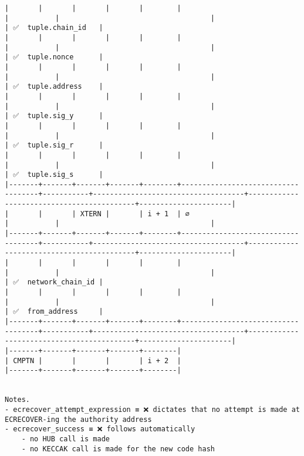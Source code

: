\documentclass[varwidth=\maxdimen,margin=0.5cm,multi={verbatim}]{standalone}
\begin{document}
\begin{verbatim}
|       |       |       |       |        |                                    |           |                                    |                                           | ✅  tuple.chain_id   |
|       |       |       |       |        |                                    |           |                                    |                                           | ✅  tuple.nonce      |
|       |       |       |       |        |                                    |           |                                    |                                           | ✅  tuple.address    |
|       |       |       |       |        |                                    |           |                                    |                                           | ✅  tuple.sig_y      |
|       |       |       |       |        |                                    |           |                                    |                                           | ✅  tuple.sig_r      |
|       |       |       |       |        |                                    |           |                                    |                                           | ✅  tuple.sig_s      |
|-------+-------+-------+-------+--------+------------------------------------+-----------+------------------------------------+-------------------------------------------+----------------------|
|       |       | XTERN |       | i + 1  | ∅                                  |           |                                    |
|-------+-------+-------+-------+--------+------------------------------------+-----------+------------------------------------+-------------------------------------------+----------------------|
|       |       |       |       |        |                                    |           |                                    |                                           | ✅  network_chain_id |
|       |       |       |       |        |                                    |           |                                    |                                           | ✅  from_address     |
|-------+-------+-------+-------+--------+------------------------------------+-----------+------------------------------------+-------------------------------------------+----------------------|
|-------+-------+-------+-------+--------|
| CMPTN |       |       |       | i + 2  |
|-------+-------+-------+-------+--------|


Notes.
- ecrecover_attempt_expression ≡ ❌ dictates that no attempt is made at ECRECOVER-ing the authority address
- ecrecover_success ≡ ❌ follows automatically
	- no HUB call is made
	- no KECCAK call is made for the new code hash

\end{verbatim}
\end{document}
